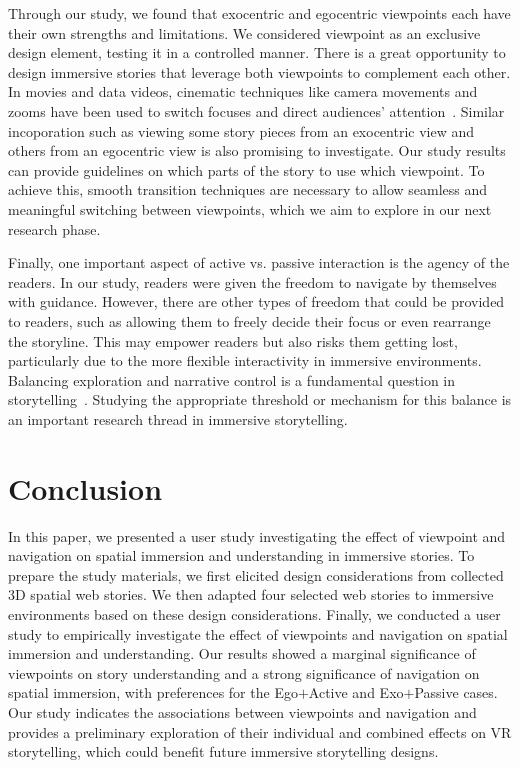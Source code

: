 Through our study, we found that exocentric and egocentric viewpoints each have their own strengths and limitations. We considered viewpoint as an exclusive design element, testing it in a controlled manner. There is a great opportunity to design immersive stories that leverage both viewpoints to complement each other. In movies and data videos, cinematic techniques like camera movements and zooms have been used to switch focuses and direct audiences' attention~\cite{amini2015understanding, xu2022from, li2023geocamera}. Similar incoporation such as viewing some story pieces from an exocentric view and others from an egocentric view is also promising to investigate. Our study results can provide guidelines on which parts of the story to use which viewpoint. To achieve this, smooth transition techniques are necessary to allow seamless and meaningful switching between viewpoints, which we aim to explore in our next research phase.


Finally, one important aspect of active vs. passive interaction is the agency of the readers. In our study, readers were given the freedom to navigate by themselves with guidance. However, there are other types of freedom that could be provided to readers, such as allowing them to freely decide their focus or even rearrange the storyline. This may empower readers but also risks them getting lost, particularly due to the more flexible interactivity in immersive environments. Balancing exploration and narrative control is a fundamental question in storytelling~\cite{thudt2018exploration}. 
Studying the appropriate threshold or mechanism for this balance is an important research thread in immersive storytelling.


\section{Conclusion}
In this paper, we presented a user study investigating the effect of viewpoint and navigation on spatial immersion and understanding in immersive stories. To prepare the study materials, we first elicited design considerations from collected 3D spatial web stories. We then adapted four selected web stories to immersive environments based on these design considerations. Finally, we conducted a user study to empirically investigate the effect of viewpoints and navigation on spatial immersion and understanding.
Our results showed a marginal significance of viewpoints on story understanding and a strong significance of navigation on spatial immersion, with preferences for the Ego$+$Active and Exo$+$Passive cases. 
Our study indicates the associations between viewpoints and navigation and provides a preliminary exploration of their individual and combined effects on VR storytelling, which could benefit future immersive storytelling designs.
